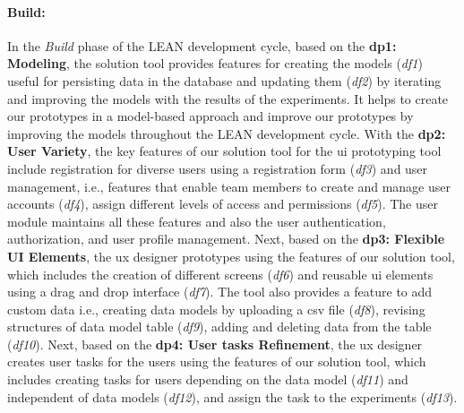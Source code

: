 \paragraph{Build:}
In the \textit{Build} phase of the LEAN development cycle, based on the \textbf{\ac{dp}1: Modeling}, the solution tool provides features for creating the models (\textit{\ac{df}1}) useful for persisting data in the database and updating them (\textit{\ac{df}2}) by iterating and improving the models with the results of the experiments.
It helps to create our prototypes in a model-based approach and improve our prototypes by improving the models throughout the LEAN development cycle.
With the \textbf{\ac{dp}2: User Variety}, the key features of our solution tool for the \ac{ui} prototyping tool include registration for diverse users using a registration form (\textit{\ac{df}3}) and user management, i.e., features that enable team members to create and manage user accounts (\textit{\ac{df}4}), assign different levels of access and permissions (\textit{\ac{df}5}).
The user module maintains all these features and also the user authentication, authorization, and user profile management.
Next, based on the \textbf{\ac{dp}3: Flexible UI Elements}, the \ac{ux} designer prototypes using the features of our solution tool, which includes the creation of different screens (\textit{\ac{df}6}) and reusable \ac{ui} elements using a drag and drop interface (\textit{\ac{df}7}). 
The tool also provides a feature to add custom data i.e., creating data models by uploading a \ac{csv} file (\textit{\ac{df}8}), revising structures of data model table (\textit{\ac{df}9}), adding and deleting data from the table (\textit{\ac{df}10}).
Next, based on the \textbf{\ac{dp}4: User tasks Refinement}, the \ac{ux} designer creates user tasks for the users using the features of our solution tool, which includes creating tasks for users depending on the data model (\textit{\ac{df}11}) and independent of data models (\textit{\ac{df}12}), and assign the task to the experiments (\textit{\ac{df}13}).

